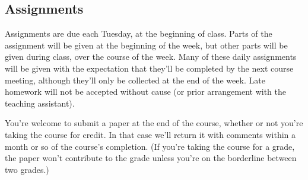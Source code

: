 \documentclass[12pt]{article}
\begin{document}

\subsection{Assignments}
Assignments are due each Tuesday, at the beginning of
class. Parts of the assignment will be given at the beginning of the
week, but other parts will be given during class, over the course of
the week.  Many of these daily assignments will be given with the
expectation that they'll be completed by the next course meeting,
although they'll only be collected at the end of the week.
Late homework will not be accepted without cause (or prior arrangement
with the teaching assistant).   

You're welcome to submit a paper at the end of the course, whether or not you're taking the course for credit.  In that case we'll return it with comments within a month or so of the course's completion.  (If you're taking the course for a grade, the paper won't contribute to the grade unless you're on  the borderline between two grades.) 
\end{document}
